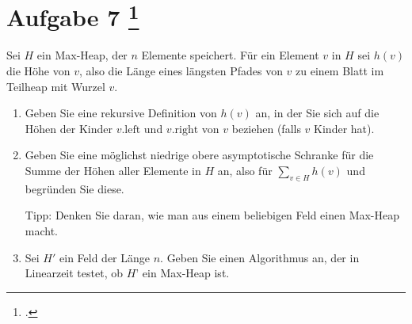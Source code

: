 \documentclass{bschlangaul-aufgabe}
\begin{document}
\section{Aufgabe 7
\footcite{examen:46115:2020:03}}

Sei $H$ ein Max-Heap, der $n$ Elemente speichert. Für ein Element $v$ in
$H$ sei $h(v)$ die Höhe von $v$, also die Länge eines längsten Pfades
von $v$ zu einem Blatt im Teilheap mit Wurzel $v$.

\begin{enumerate}


\item Geben Sie eine rekursive Definition von $h(v)$ an, in der Sie sich
auf die Höhen der Kinder $v.\text{left}$ und $v.\text{right}$ von $v$
beziehen (falls $v$ Kinder hat).



\item Geben Sie eine möglichst niedrige obere asymptotische Schranke für
die Summe der Höhen aller Elemente in $H$ an, also für $\sum_{v \in H}
h(v)$ und begründen Sie diese.

Tipp: Denken Sie daran, wie man aus einem beliebigen Feld einen Max-Heap
macht.


\item Sei $H'$ ein Feld der Länge $n$. Geben Sie einen Algorithmus an,
der in Linearzeit testet, ob $H’$ ein Max-Heap ist.
\end{enumerate}
\end{document}
